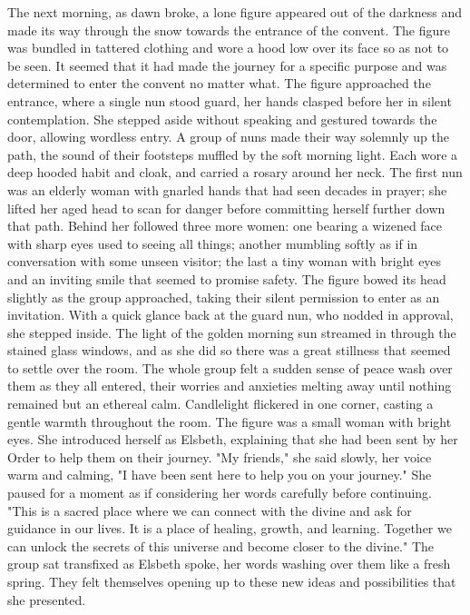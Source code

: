 \documentclass[11pt]{article}
\begin{document}
The next morning, as dawn broke, a lone figure appeared out of the darkness and made its way through the snow towards the entrance of the convent. The figure was bundled in tattered clothing and wore a hood low over its face so as not to be seen. It seemed that it had made the journey for a specific purpose and was determined to enter the convent no matter what.
The figure approached the entrance, where a single nun stood guard, her hands clasped before her in silent contemplation. She stepped aside without speaking and gestured towards the door, allowing wordless entry. A group of nuns made their way solemnly up the path, the sound of their footsteps muffled by the soft morning light. Each wore a deep hooded habit and cloak, and carried a rosary around her neck. The first nun was an elderly woman with gnarled hands that had seen decades in prayer; she lifted her aged head to scan for danger before committing herself further down that path. Behind her followed three more women: one bearing a wizened face with sharp eyes used to seeing all things; another mumbling softly as if in conversation with some unseen visitor; the last a tiny woman with bright eyes and an inviting smile that seemed to promise safety.
The figure bowed its head slightly as the group approached, taking their silent permission to enter as an invitation. With a quick glance back at the guard nun, who nodded in approval, she stepped inside. The light of the golden morning sun streamed in through the stained glass windows, and as she did so there was a great stillness that seemed to settle over the room.
The whole group felt a sudden sense of peace wash over them as they all entered, their worries and anxieties melting away until nothing remained but an ethereal calm. Candlelight flickered in one corner, casting a gentle warmth throughout the room.
The figure was a small woman with bright eyes. She introduced herself as Elsbeth, explaining that she had been sent by her Order to help them on their journey.
"My friends," she said slowly, her voice warm and calming, "I have been sent here to help you on your journey." She paused for a moment as if considering her words carefully before continuing. "This is a sacred place where we can connect with the divine and ask for guidance in our lives. It is a place of healing, growth, and learning. Together we can unlock the secrets of this universe and become closer to the divine."
The group sat transfixed as Elsbeth spoke, her words washing over them like a fresh spring. They felt themselves opening up to these new ideas and possibilities that she presented.
\end{document}
